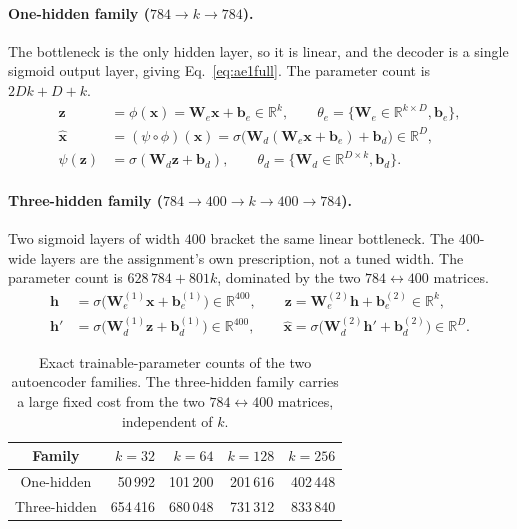 \documentclass[11pt,a4paper]{article}
\newcommand{\R}{\mathbb{R}}\newcommand{\given}{\mid}\newcommand{\Acc}{\mathrm{Acc}}
\begin{document}
\paragraph{One-hidden family ($784\rightarrow k\rightarrow784$).}
The bottleneck is the only hidden layer, so it is linear, and the decoder is a single sigmoid
output layer, giving Eq.~\eqref{eq:ae1full}.  The parameter count is $2Dk+D+k$.
\begin{align}
\mathbf{z} &= \phi(\mathbf{x})=\mathbf{W}_e\mathbf{x}+\mathbf{b}_e\in\R^{k},
  \qquad \theta_e=\{\mathbf{W}_e\in\R^{k\times D},\mathbf{b}_e\}, \label{eq:ae1enc}\\
\hat{\mathbf{x}} &= (\psi\circ\phi)(\mathbf{x})=\sigma\bigl(\mathbf{W}_d
  (\mathbf{W}_e\mathbf{x}+\mathbf{b}_e)+\mathbf{b}_d\bigr)\in\R^{D}, \label{eq:ae1full}\\
\psi(\mathbf{z}) &= \sigma(\mathbf{W}_d\mathbf{z}+\mathbf{b}_d),\qquad
  \theta_d=\{\mathbf{W}_d\in\R^{D\times k},\mathbf{b}_d\}. \label{eq:ae1dec}
\end{align}

\paragraph{Three-hidden family ($784\rightarrow400\rightarrow k\rightarrow400\rightarrow784$).}
Two sigmoid layers of width $400$ bracket the same linear bottleneck.  The $400$-wide layers are
the assignment's own prescription, not a tuned width.  The parameter count is
$628\,784+801k$, dominated by the two $784\leftrightarrow400$ matrices.
\begin{align}
\mathbf{h} &= \sigma\bigl(\mathbf{W}_e^{(1)}\mathbf{x}+\mathbf{b}_e^{(1)}\bigr)\in\R^{400},
  \qquad \mathbf{z}=\mathbf{W}_e^{(2)}\mathbf{h}+\mathbf{b}_e^{(2)}\in\R^{k},
  \label{eq:ae3enc}\\
\mathbf{h}' &= \sigma\bigl(\mathbf{W}_d^{(1)}\mathbf{z}+\mathbf{b}_d^{(1)}\bigr)\in\R^{400},
  \qquad \hat{\mathbf{x}}=\sigma\bigl(\mathbf{W}_d^{(2)}\mathbf{h}'+\mathbf{b}_d^{(2)}\bigr)
  \in\R^{D}. \label{eq:ae3dec}
\end{align}

\begin{table}[htbp]\centering
\caption{Exact trainable-parameter counts of the two autoencoder families.  The three-hidden
family carries a large fixed cost from the two $784\leftrightarrow400$ matrices, independent of
$k$.}\label{tab:aeparams}
\begin{tabular}{@{}crrrr@{}}
\toprule Family & $k=32$ & $k=64$ & $k=128$ & $k=256$ \\ \midrule
One-hidden   & 50\,992 & 101\,200 & 201\,616 & 402\,448 \\
Three-hidden & 654\,416 & 680\,048 & 731\,312 & 833\,840 \\
\bottomrule
\end{tabular}
\end{table}
\end{document}
